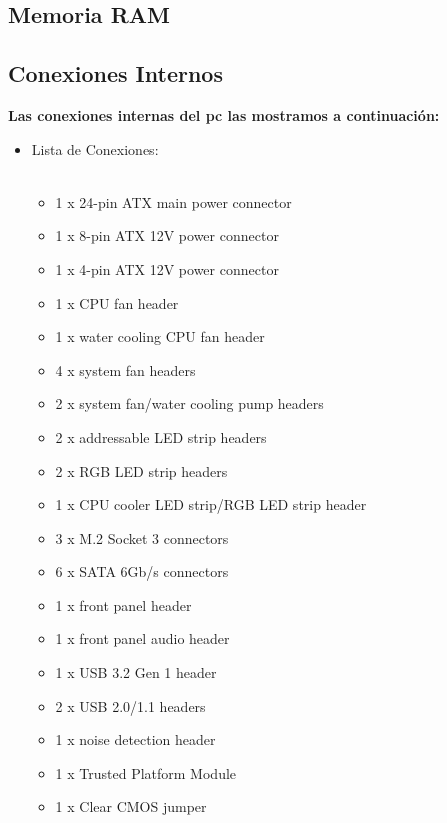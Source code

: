 \documentclass{article}
\begin{document}
\newpage
\subsection{Memoria RAM}

\newpage

\subsection{Conexiones Internos}

\normalsize
  {\bfseries Las conexiones internas del pc las mostramos a continuación: }%
  \begin{itemize}
    \item Lista de Conexiones:\\
    \\
    \begin{minipage}{0.5\textwidth}
      \begin{itemize}%
        \item 1 x 24-pin ATX main power connector
        \item 1 x 8-pin ATX 12V power connector
        \item 1 x 4-pin ATX 12V power connector
        \item 1 x CPU fan header
        \item 1 x water cooling CPU fan header
        \item 4 x system fan headers
        \item 2 x system fan/water cooling pump headers
        \item 2 x addressable LED strip headers
        \item 2 x RGB LED strip headers
        \item 1 x CPU cooler LED strip/RGB LED strip header
        \item 3 x M.2 Socket 3 connectors
        \item 6 x SATA 6Gb/s connectors
        \item 1 x front panel header
        \item 1 x front panel audio header
        \item 1 x USB 3.2 Gen 1 header
        \item 2 x USB 2.0/1.1 headers
        \item 1 x noise detection header
        \item 1 x Trusted Platform Module
        \item 1 x Clear CMOS jumper

\end{itemize}
\end{minipage}
\end{itemize}
\end{document}
